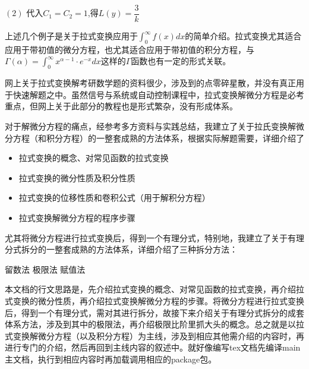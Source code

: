 \documentclass[12pt]{report}
\begin{document}
  \vspace{-5pt}
  
  \hspace{3em}$(2)$ 代入$C_{1}=C_{2}=1$,得$L\left(y\right)=\dfrac{3}{k}$
  
  \clearpage
  
  上述几个例子是关于拉式变换应用于$\int_{0}^{\infty}f\left(x\right)dx$的简单介绍。拉式变换尤其适合应用于带初值的微分方程，也尤其适合应用于带初值的积分方程，与$\Gamma\left(\alpha\right)=\int_{0}^{\infty}x^{\alpha-1}\cdot e^{-x}dx$这样的$\Gamma$函数也有一定的形式关联。
  
  网上关于拉式变换解考研数学题的资料很少，涉及到的点零碎星散，并没有真正用于快速解题之中。虽然信号与系统或自动控制课程中，拉式变换解微分方程是必考重点，但网上关于此部分的教程也是形式繁杂，没有形成体系。
  
  对于解微分方程的痛点，经参考多方资料与实践总结，我建立了关于拉氏变换解微分方程（和积分方程）的一整套成熟的方法体系，根据实际解题需要，详细介绍了 \begin{itemize}
  	\item 拉式变换的概念、对常见函数的拉式变换
  	\item   拉式变换的微分性质及积分性质
  	\item   拉式变换的位移性质和卷积公式（用于解积分方程）
  	\item   拉式变换解微分方程的程序步骤
  \end{itemize}

尤其将微分方程进行拉式变换后，得到一个有理分式，特别地，我建立了关于有理分式拆分的一整套成熟的方法体系，详细介绍了三种拆分方法：

\vspace{-10pt}

\begin{center}
	\textbullet \hspace{0.5em} 留数法  \hspace{1cm}  \textbullet \hspace{0.5em} 极限法 \hspace{1cm}  \textbullet \hspace{0.5em} 赋值法 
\end{center}

\vspace{-10pt}

本文档的行文思路是，先介绍拉式变换的概念、对常见函数的拉式变换，再介绍拉式变换的微分性质，再介绍拉式变换解微分方程的步骤。将微分方程进行拉式变换后，得到一个有理分式，需对其进行拆分，故接下来介绍关于有理分式拆分的成套体系方法，涉及到其中的极限法，再介绍极限比阶里抓大头的概念。总之就是以拉式变换解微分方程（以及积分方程）为主线，涉及到相应其他需介绍的内容时，再进行专门的介绍，然后再回到主线内容的叙述中。就好像编写tex文档先编译main主文档，执行到相应内容时再加载调用相应的package包。
\end{document}
